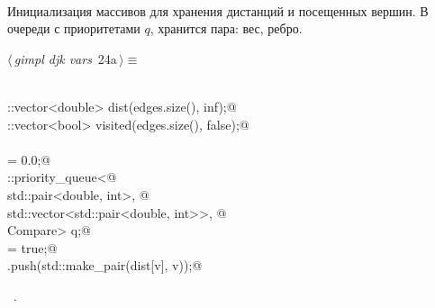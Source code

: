 \documentclass[12pt]{article}
\begin{document}
\paragraph{}
Инициализация массивов для хранения дистанций и посещенных вершин.
В очереди с приоритетами $q$, хранится пара: вес, ребро.
\begin{flushleft} \small
\begin{minipage}{\linewidth}\label{scrap37}\raggedright\small
{} $\langle\,${\itshape gimpl djk vars}\nobreak\ {\footnotesize {24a}}$\,\rangle\equiv$
\vspace{-1ex}
\begin{list}{}{} \item
\mbox{}\verb@@\\
\mbox{}\verb@std::vector<double> dist(edges.size(), inf);@\\
\mbox{}\verb@std::vector<bool> visited(edges.size(), false);@\\
\mbox{}\verb@@\\
\mbox{}\verb@dist[v] = 0.0;@\\
\mbox{}\verb@std::priority_queue<@\\
\mbox{}\verb@  std::pair<double, int>, @\\
\mbox{}\verb@  std::vector<std::pair<double, int>>, @\\
\mbox{}\verb@  Compare> q;@\\
\mbox{}\verb@visited[v] = true;@\\
\mbox{}\verb@q.push(std::make_pair(dist[v], v));@\\
\mbox{}\verb@@{\NWsep}
\end{list}
\vspace{-1.5ex}
\footnotesize
\begin{list}{}{\setlength{\itemsep}{-\parsep}\setlength{\itemindent}{-\leftmargin}}
\item \NWtxtMacroRefIn\ .

\item{}
\end{list}
\end{minipage}\vspace{4ex}
\end{flushleft}
\end{document}
